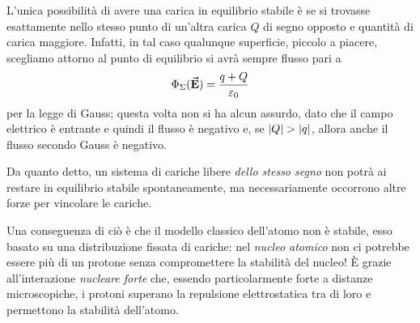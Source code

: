 L'unica possibilità di avere una carica in equilibrio stabile è se si trovasse esattamente nello stesso punto di un'altra carica $Q$ di segno opposto e quantità di carica maggiore. Infatti, in tal caso qualunque superficie, piccolo a piacere, scegliamo attorno al punto di equilibrio si avrà sempre flusso pari a
\begin{equation*}
	\Phi_{\Sigma}(\vb*{\va{E}})=\frac{q+Q}{\varepsilon_0}
\end{equation*}
per la legge di Gauss; questa volta non si ha alcun assurdo, dato che il campo elettrico è entrante e quindi il flusso è negativo e, se $\abs{Q}>\abs{q}$, allora anche il flusso secondo Gauss è negativo.
\begin{digression}
	Da quanto detto, un sistema di cariche libere \textit{dello stesso segno} non potrà ai restare in equilibrio stabile spontaneamente, ma necessariamente occorrono altre forze per vincolare le cariche.
	
	Una conseguenza di ciò è che il modello classico dell'atomo non è stabile, esso basato su una distribuzione fissata di cariche: nel \textit{nucleo atomico} non ci potrebbe essere più di un protone senza compromettere la stabilità del nucleo! È grazie all'interazione \textit{nucleare forte} che, essendo particolarmente forte a distanze microscopiche, i protoni superano la repulsione elettrostatica tra di loro e permettono la stabilità dell'atomo.
\end{digression}
